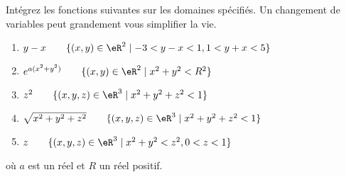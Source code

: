 
\begin{exercice}\label{exoIntMult0002}

Intégrez les fonctions suivantes sur les domaines spécifiés. Un changement de variables peut grandement vous simplifier la vie.
\begin{enumerate}
\item $ y-x \qquad \{(x,y)\in \eR^2 \mid -3<y - x<1, 1<y +x <5 \} $
\item $ e^{a(x^2+y^2)} \qquad \{(x,y)\in \eR^2 \mid x^2+y^2 <R^2 \} $
\item $ z^2 \qquad \{(x,y,z)\in \eR^3 \mid x^2+y^2+z^2 <1 \} $
\item $ \sqrt{x^2+y^2+z^2} \qquad \{(x,y,z)\in \eR^3 \mid x^2+y^2+z^2 <1 \}$
\item $ z \qquad \{(x,y,z)\in \eR^3 \mid x^2 + y^2 < z^2, 0<z<1 \} $
\end{enumerate}
où $a$ est un réel et $R$ un réel positif.

\end{exercice}
